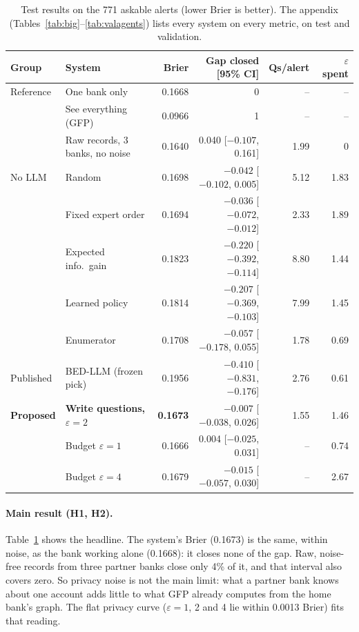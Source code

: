 \documentclass[11pt,a4paper]{article}
\newcommand{\eps}{\varepsilon}
\begin{document}
\begin{table}[t]
\centering\small
\begin{tabular}{llrrrr}
\toprule
Group & System & Brier & Gap closed [95\% CI] & Qs/alert & $\eps$ spent \\
\midrule
Reference & One bank only & 0.1668 & 0 & -- & -- \\
& See everything (GFP) & 0.0966 & 1 & -- & -- \\
& Raw records, 3 banks, no noise & 0.1640 & 0.040 [$-0.107$, 0.161] & 1.99 & 0 \\
\midrule
No LLM & Random & 0.1698 & $-0.042$ [$-0.102$, 0.005] & 5.12 & 1.83 \\
& Fixed expert order & 0.1694 & $-0.036$ [$-0.072$, $-0.012$] & 2.33 & 1.89 \\
& Expected info.\ gain & 0.1823 & $-0.220$ [$-0.392$, $-0.114$] & 8.80 & 1.44 \\
& Learned policy & 0.1814 & $-0.207$ [$-0.369$, $-0.103$] & 7.99 & 1.45 \\
& Enumerator & 0.1708 & $-0.057$ [$-0.178$, 0.055] & 1.78 & 0.69 \\
\midrule
Published & BED-LLM (frozen pick) & 0.1956 & $-0.410$ [$-0.831$, $-0.176$] & 2.76 & 0.61 \\
\midrule
\textcolor{ours}{\textbf{Proposed}} & \textbf{Write questions, $\eps=2$} & \textbf{0.1673} & $\mathbf{-0.007}$ [$-0.038$, 0.026] & 1.55 & 1.46 \\
& Budget $\eps=1$ & 0.1666 & 0.004 [$-0.025$, 0.031] & -- & 0.74 \\
& Budget $\eps=4$ & 0.1679 & $-0.015$ [$-0.057$, 0.030] & -- & 2.67 \\
\bottomrule
\end{tabular}
\caption{Test results on the 771 askable alerts (lower Brier is better). The appendix (Tables~\ref{tab:big}--\ref{tab:valagents}) lists every system on every metric, on test and validation.}
\label{tab:main}
\end{table}

\paragraph{Main result (H1, H2).} Table~\ref{tab:main} shows the headline. The system's Brier (0.1673) is the same, within noise, as the bank working alone (0.1668): it closes none of the gap. Raw, noise-free records from three partner banks close only 4\% of it, and that interval also covers zero. So privacy noise is not the main limit: what a partner bank knows about one account adds little to what GFP already computes from the home bank's graph. The flat privacy curve ($\eps=1$, 2 and 4 lie within 0.0013 Brier) fits that reading.
\end{document}
